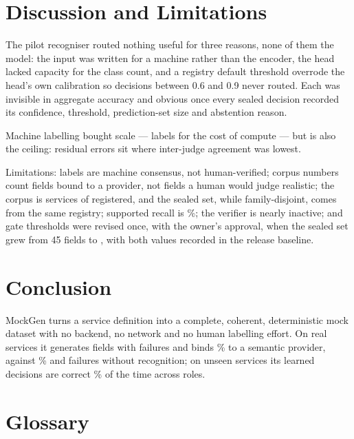 \documentclass[conference]{IEEEtran}
\newcommand{\system}{MockGen}
\begin{document}
\section{Discussion and Limitations}
\label{sec:discussion}

The pilot recogniser routed nothing useful for three reasons, none of
them the model: the input was written for a machine rather than the
encoder, the head lacked capacity for the class count, and a registry
default threshold overrode the head's own calibration so decisions
between 0.6 and 0.9 never routed. Each was invisible in aggregate
accuracy and obvious once every sealed decision recorded its confidence,
threshold, prediction-set size and abstention reason.

Machine labelling bought scale --- \LabelFields{} labels for the cost of
compute --- but is also the ceiling: residual errors sit where
inter-judge agreement was lowest.

Limitations: labels are machine consensus, not human-verified; corpus
numbers count fields bound to a provider, not fields a human would judge
realistic; the corpus is \CorpusServices{} services of
\RegistryServices{} registered, and the sealed set, while
family-disjoint, comes from the same registry; supported recall is
\SupportedRecall\%; the verifier is nearly inactive; and gate thresholds
were revised once, with the owner's approval, when the sealed set grew
from 45 fields to \SealedRows{}, with both values recorded in the
release baseline.

\section{Conclusion}
\label{sec:conclusion}

\system{} turns a service definition into a complete, coherent,
deterministic mock dataset with no backend, no network and no human
labelling effort. On \CorpusServices{} real services it generates
\CorpusFields{} fields with \CorpusFailed{} failures and binds
\ProviderBoundPct\% to a semantic provider, against
\DetProviderBoundPct\% and \DetFailed{} failures without recognition; on
\SealedServices{} unseen services its learned decisions are correct
\SealedPrecision\% of the time across \RoutableRoles{} roles.

\section*{Glossary}
\end{document}
